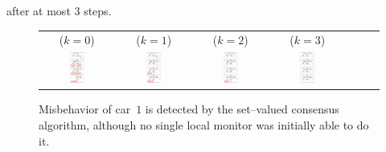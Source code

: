 after at most $3$ steps.
\begin{figure}[!]
\centering
\begin{tabular}{ccccccc}
($k=0$) & ($k=1$) & ($k=2$) & ($k=3$) \\
\hspace{10pt}
\includegraphics[width=0.22\textwidth,clip]{images/consensus-0.pdf}
&
\includegraphics[width=0.22\textwidth,clip]{images/consensus-1.pdf}
&
\includegraphics[width=0.22\textwidth,clip]{images/consensus-2.pdf}
&
\includegraphics[width=0.22\textwidth,clip]{images/consensus-3.pdf}
\end{tabular}
\caption{Misbehavior of car~$1$ is detected by the set--valued consensus algorithm, although no single local monitor was initially able to do it.}
\label{fig:faulty-centr-consensus2}
\end{figure}

\AFnewpage
